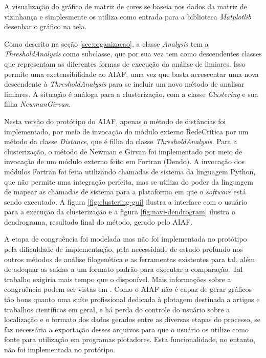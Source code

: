 A visualização do gráfico de matriz de cores se baseia nos dados da matriz de vizinhança e simplesmente os utiliza como entrada para a biblioteca
\textit{Matplotlib} desenhar o gráfico na tela.

Como descrito na seção \ref{sec:organizacao}, a classe \textit{Analysis} tem a \textit{ThresholdAnalysis} como subclasse,
que por sua vez tem como descendentes classes que representam as diferentes formas de execução da análise de limiares. Isso permite uma exetensibilidade
ao AIAF, uma vez que basta acrescentar uma nova descendente à \textit{ThresholdAnalysis} para se incluir um novo método de analisar limiares. A situação
é análoga para a clusterização, com a classe \textit{Clustering} e sua filha \textit{NewmanGirvan}.

Nesta versão do protótipo do AIAF, apenas o método de distâncias foi implementado, por meio de invocação do módulo externo RedeCrítica por um método da
classe \textit{Distance}, que é filha da classe \textit{ThresholdAnalysis}. Para a clusterização, o método de Newman e Girvan foi implementado por meio
de invocação de um módulo externo feito em Fortran (Dendo). A invocação dos módulos Fortran foi feita utilizando chamadas de sistema da linguagem Python,
que não permite uma integração perfeita, mas se utiliza do poder da linguagem de mapear as chamadas de sistema para a plataforma em que o \textit{software}
está sendo executado. A figura \ref{fig:clustering-gui} ilustra a interface com o usuário para a execução da clusterização e a figura \ref{fig:navi-dendrogram}
ilustra o dendrograma, resultado final do método, gerado pelo AIAF.

A etapa de congruência foi modelada mas não foi implementada no protótipo pela dificuldade de implementação, pela necessidade de estudo profundo nos outros
métodos de análise filogenética e as ferramentas existentes para tal, além de adequar as saídas a um formato padrão para executar a comparação. Tal trabalho
exigiria mais tempo que o disponível. Mais informações sobre a congruência podem
ser vistas em \cite{marcelo2010}. Como o AIAF não é capaz de gerar gráficos tão bons quanto uma suíte profissional dedicada à plotagem destinada a artigos e
trabalhos científicos em geral, e há perda do controle do usuário sobre a localização e o formato dos dados gerados entre as diversas etapas do processo, se
faz necessária a exportação desses arquivos para que o usuário os utilize como fonte para utilização em programas plotadores.
Esta funcionalidade, no entanto, não foi implementada no protótipo.

